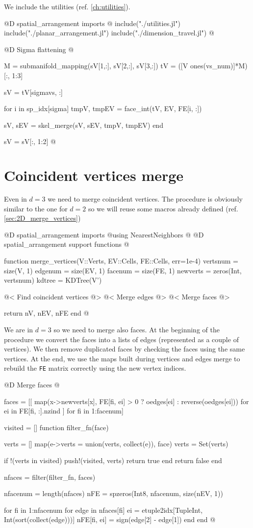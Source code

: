 We include the utilities (ref. \ref{ch:utilities}).

@D spatial\_arrangement imports
@{
include("./utilities.jl")
include("./planar_arrangement.jl")
include("./dimension_travel.jl")
@}


@D Sigma flattening
@{M = submanifold_mapping(sV[1,:], sV[2,:], sV[3,:])
tV = ([V ones(vs_num)]*M)[:, 1:3]

sV = tV[sigmavs, :]

for i in sp_idx[sigma]
    tmpV, tmpEV = face_int(tV, EV, FE[i, :])
    
    sV, sEV = skel_merge(sV, sEV, tmpV, tmpEV)
end

sV = sV[:, 1:2]
@}



\section{Coincident vertices merge}
\label{sec:3D_merge_vertices}
Even in $d=3$ we need to merge coincident vertices.
The procedure is obviously similar to the one for $d=2$ so we will
reuse some macros already defined (ref. \ref{sec:2D_merge_vertices})

@D spatial\_arrangement imports
@{using NearestNeighbors
@}
@D spatial\_arrangement support functions
@{function merge_vertices(V::Verts, EV::Cells, FE::Cells, err=1e-4)
    vertsnum = size(V, 1)
    edgenum = size(EV, 1)
    facenum = size(FE, 1)
    newverts = zeros(Int, vertsnum)
    kdtree = KDTree(V')

    @< Find coincident vertices @>
    @< Merge edges @>
    @< Merge faces @>

    return nV, nEV, nFE
end
@}

We are in $d=3$ so we need to merge also faces.
At the beginning of the procedure we convert the faces into a lists of
edges (represented as a couple of vertices). We then remove duplicated faces
by checking the faces using the same vertices. At the end, we use the
maps built during vertices and edges merge to rebuild the \texttt{FE}
matrix correctly using the new vertex indices.

@D Merge faces
@{faces = [[
    map(x->newverts[x], FE[fi, ei] > 0 ? oedges[ei] : reverse(oedges[ei]))
    for ei in FE[fi, :].nzind
] for fi in 1:facenum]


visited = []
function filter_fn(face)

    verts = []
    map(e->verts = union(verts, collect(e)), face)
    verts = Set(verts)

    if !(verts in visited)
        push!(visited, verts)
        return true
    end
    return false
end

nfaces = filter(filter_fn, faces)

nfacenum = length(nfaces)
nFE = spzeros(Int8, nfacenum, size(nEV, 1))

for fi in 1:nfacenum
    for edge in nfaces[fi]
        ei = etuple2idx[Tuple{Int, Int}(sort(collect(edge)))]
        nFE[fi, ei] = sign(edge[2] - edge[1])
    end
end
@}
